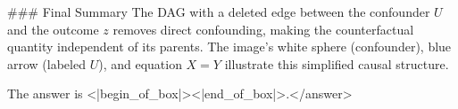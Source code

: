 ### Final Summary  
The DAG with a deleted edge between the confounder \( U \) and the outcome \( z \) removes direct confounding, making the counterfactual quantity independent of its parents. The image’s white sphere (confounder), blue arrow (labeled \( U \)), and equation \( X = Y \) illustrate this simplified causal structure.  

The answer is <|begin_of_box|><|end_of_box|>.</answer>